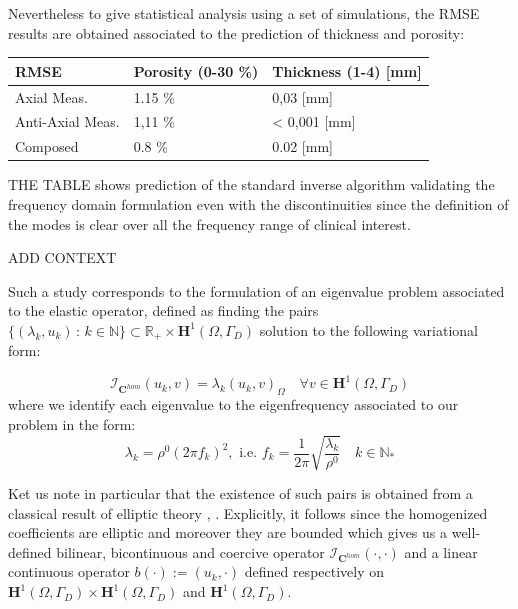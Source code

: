 Nevertheless to give statistical analysis using a set of simulations, the RMSE results are obtained associated to the prediction of thickness and porosity:
\begin{center}
\vspace{2ex}
\begin{tabular}{l l l}
\toprule
\textbf{RMSE} & \textbf{Porosity} (0-30 \%) & \textbf{Thickness} (1-4) [mm]\\
\midrule
Axial Meas. & 1.15 \% & 0,03  [mm]\\
Anti-Axial Meas. & 1,11 \%  & < 0,001 [mm]\\
Composed & 0.8 \% & 0.02 [mm] \\
\bottomrule
\end{tabular}
\end{center}

THE TABLE shows prediction of the standard inverse algorithm \cite{Minonzio2018} validating the frequency domain formulation even with the discontinuities since the definition of the modes is clear over all the frequency range of clinical interest.

ADD CONTEXT 

Such a study corresponds to the formulation of an eigenvalue problem associated to the elastic operator, defined as finding the pairs $\{(\lambda_k, u_k) \, : \, k \in \mathbb{N} \} \subset \mathbb{R}_+ \times \mathbf{H}^1(\Omega, \Gamma_D)$ solution to the following variational form:

\begin{equation*}
    \label{VariationalEigenProb}
    \mathcal{I}_{\mathbf{C}^{hom}} (u_k, v) = \lambda_k (u_k, v)_{\Omega} \quad \forall v \in \mathbf{H}^1(\Omega, \Gamma_D)
\end{equation*}
where we identify each eigenvalue to the eigenfrequency associated to our problem in the form:
\begin{equation*}
    \lambda_k = \rho^0 (2\pi f_k)^2, \text{ i.e. } f_k = \frac{1}{2\pi} \sqrt{\frac{\lambda_k}{\rho^0}} \quad k \in \mathbb{N}_{*}
\end{equation*}

\begin{rem}
Ket us note in particular that the existence of such pairs is obtained from a classical result of elliptic theory \cite{raviart1983introduction}, \cite{evans2010partial}. Explicitly, it follows since the homogenized coefficients are elliptic and moreover they are bounded which gives us a well-defined bilinear, bicontinuous and coercive operator $\mathcal{I}_{\mathbf{C}^{hom}}(\cdot, \cdot)$ and a linear continuous operator $b(\cdot) := (u_k, \cdot)$ defined respectively on $\mathbf{H}^1(\Omega, \Gamma_D)\times \mathbf{H}^1(\Omega, \Gamma_D)$ and $\mathbf{H}^1(\Omega, \Gamma_D)$.
\end{rem}



